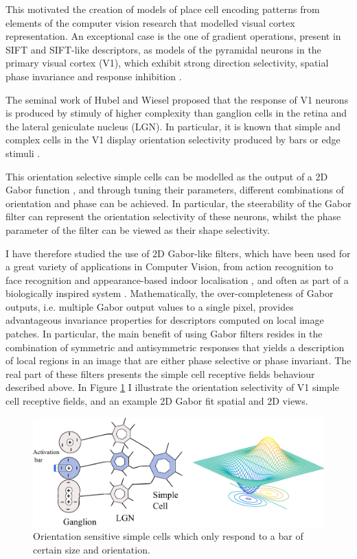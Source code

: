 This motivated the creation of models of place cell encoding patterns from elements of the computer vision research that modelled visual cortex representation. An exceptional case is the one of gradient operations, present in SIFT and SIFT-like descriptors, as models of the pyramidal neurons in the primary visual cortex (V1), which exhibit strong direction selectivity, spatial phase invariance and response inhibition \cite{hubel1962receptive, dhruv2014cascaded,carandini2006simple}.

The seminal work of Hubel and Wiesel \cite{hubel1962receptive} proposed that the response of V1 neurons is produced by stimuly of higher complexity than ganglion cells in the retina and the lateral geniculate nucleus (LGN). In particular, it is known that simple and complex cells in the V1 display orientation selectivity produced by bars or edge stimuli \cite{payne2001cat}.

This orientation selective simple cells can be modelled as the output of a 2D Gabor function \cite{daugman1985uncertainty}, and through tuning their parameters, different combinations of orientation and phase can be achieved. In particular, the steerability of the Gabor filter can represent the orientation selectivity of these neurons, whilst the phase parameter of the filter can be viewed as their shape selectivity. 

I have therefore studied the use of 2D Gabor-like filters, which have been used for a great variety of applications in Computer Vision, from action recognition \cite{shu2014bio} to face recognition \cite{liao2013partial} and appearance-based indoor localisation \cite{rivera2015appearance}, and often as part of a biologically inspired system \cite{shu2014bio}. Mathematically, the over-completeness of Gabor outputs, i.e. multiple Gabor output values to a single pixel, provides advantageous invariance properties for descriptors computed on local image patches. In particular, the main benefit of using Gabor filters resides in the combination of symmetric and antisymmetric responses that yields a description of local regions in an image that are either phase selective or phase invariant. The real part of these filters presents the simple cell receptive fields behaviour described above. In Figure \ref{fig:simple_cell} I illustrate the orientation selectivity of V1 simple cell receptive fields, and an example 2D Gabor fit spatial and 2D views.


\begin{figure}[h]
\centering
\includegraphics[width=.8\textwidth]{gfx/Chapter05/simple_cell_gabor.pdf}
\caption{Orientation sensitive simple cells which only respond to a bar of certain size and orientation.}
\label{fig:simple_cell}
\end{figure}

